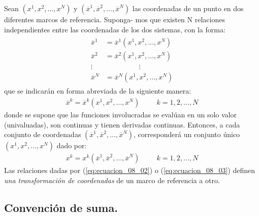 Sean $(x^{1}, x^{2}, \ldots, x^{N})$ y $(\overline{x}^{1}, \overline{x}^{2}, \ldots , \overline{x}^{N})$ las coordenadas de un punto en dos diferentes marcos de referencia. Suponga- mos que existen N relaciones independientes entre las coordenadas de los dos sistemas, con la forma:
\begin{align}
\begin{aligned}
\overline{x}^{1} &= \overline{x}^{1} (x^{1}, x^{2}, \ldots, x^{N}) \\
\overline{x}^{2} &= \overline{x}^{2} (x^{1}, x^{2}, \ldots, x^{N}) \\
\vdots &{} \hspace{2cm} \vdots \\
\overline{x}^{N} &= \overline{x}^{N} (x^{1}, x^{2}, \ldots, x^{N})
\end{aligned}
\label{eq:ecuacion_08_01}
\end{align}
que se indicarán en forma abreviada de la siguiente manera:
\begin{align}
\overline{x}^{k} = \overline{x}^{k} (x^{1}, x^{2}, \ldots, x^{N}) \hspace{1cm} k = 1, 2, \ldots, N
\label{eq:ecuacion_08_02}
\end{align}
donde se supone que las funciones involucradas se evalúan en un solo valor (univaluadas), son continuas y tienen derivadas continuas. Entonces, a cada conjunto de coordenadas $(\overline{x}^{1}, \overline{x}^{2}, \ldots, \overline{x}^{N})$, corresponderá un conjunto único $(x^{1}, x^{2}, \ldots, x^{N})$ dado por:
\begin{align}
x^{k} = x^{k} (\overline{x}^{1}, \overline{x}^{2}, \ldots, \overline{x}^{N}) \hspace{1cm} k = 1, 2, \ldots, N
\label{eq:ecuacion_08_03}
\end{align}
Las relaciones dadas por (\ref{eq:ecuacion_08_02}) o (\ref{eq:ecuacion_08_03}) definen \emph{una transformación de coordenadas} de un marco de referencia a otro.

\subsection*{Convención de suma.}

